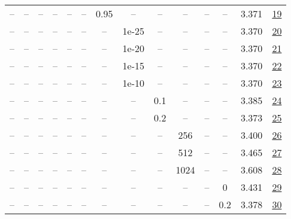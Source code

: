 \begin{table}[H]
\begin{tabular}{cccccccccccccc}
-- & -- & -- & -- & -- & -- & 0.95 & -- & -- & -- & -- & -- & 3.371 & \href{https://wandb.ai/stanford-mercury/optimizer-scaling/runs/sweep-130m-5B-muon4d5315lr0.008-wd0.1-minlr0-warmup0-b10.8-b20.9-d3e612}{19} \\
-- & -- & -- & -- & -- & -- & -- & 1e-25 & -- & -- & -- & -- & 3.370 & \href{https://wandb.ai/stanford-mercury/optimizer-scaling/runs/sweep-130m-5B-muon7e15a1lr0.008-wd0.1-minlr0-warmup0-b10.8-b20.9-0132f8}{20} \\
-- & -- & -- & -- & -- & -- & -- & 1e-20 & -- & -- & -- & -- & 3.370 & \href{https://wandb.ai/stanford-mercury/optimizer-scaling/runs/sweep-130m-5B-muona85b5alr0.008-wd0.1-minlr0-warmup0-b10.8-b20.9-c272e7}{21} \\
-- & -- & -- & -- & -- & -- & -- & 1e-15 & -- & -- & -- & -- & 3.370 & \href{https://wandb.ai/stanford-mercury/optimizer-scaling/runs/sweep-130m-5B-muonf5b405lr0.008-wd0.1-minlr0-warmup0-b10.8-b20.9-bd4ae9}{22} \\
-- & -- & -- & -- & -- & -- & -- & 1e-10 & -- & -- & -- & -- & 3.370 & \href{https://wandb.ai/stanford-mercury/optimizer-scaling/runs/sweep-130m-5B-muon90526elr0.008-wd0.1-minlr0-warmup0-b10.8-b20.9-316987}{23} \\
-- & -- & -- & -- & -- & -- & -- & -- & 0.1 & -- & -- & -- & 3.385 & \href{https://wandb.ai/stanford-mercury/optimizer-scaling/runs/sweep-130m-5B-muon3efb6clr0.008-wd0.1-minlr0-warmup0-b10.8-b20.9-a17a47}{24} \\
-- & -- & -- & -- & -- & -- & -- & -- & 0.2 & -- & -- & -- & 3.373 & \href{https://wandb.ai/stanford-mercury/optimizer-scaling/runs/sweep-130m-5B-muoneae139lr0.008-wd0.1-minlr0-warmup0-b10.8-b20.9-c41ff5}{25} \\
-- & -- & -- & -- & -- & -- & -- & -- & -- & 256 & -- & -- & 3.400 & \href{https://wandb.ai/stanford-mercury/optimizer-scaling/runs/sweep-130m-5B-muon397840lr0.008-wd0.1-minlr0-warmup0-b10.8-b20.9-5abd23}{26} \\
-- & -- & -- & -- & -- & -- & -- & -- & -- & 512 & -- & -- & 3.465 & \href{https://wandb.ai/stanford-mercury/optimizer-scaling/runs/sweep-130m-5B-muon972c8blr0.008-wd0.1-minlr0-warmup0-b10.8-b20.9-f41012}{27} \\
-- & -- & -- & -- & -- & -- & -- & -- & -- & 1024 & -- & -- & 3.608 & \href{https://wandb.ai/stanford-mercury/optimizer-scaling/runs/sweep-130m-5B-muon479414lr0.008-wd0.1-minlr0-warmup0-b10.8-b20.9-c30205}{28} \\
-- & -- & -- & -- & -- & -- & -- & -- & -- & -- & -- & 0 & 3.431 & \href{https://wandb.ai/stanford-mercury/optimizer-scaling/runs/sweep-130m-5B-muon2c6c55lr0.008-wd0-minlr0-warmup0-b10.8-b20.98--1d92a5}{29} \\
-- & -- & -- & -- & -- & -- & -- & -- & -- & -- & -- & 0.2 & 3.378 & \href{https://wandb.ai/stanford-mercury/optimizer-scaling/runs/sweep-130m-5B-muon8527a8lr0.008-wd0.2-minlr0-warmup0-b10.8-b20.9-d76fe4}{30} \\
\bottomrule
\end{tabular}
\end{table}

